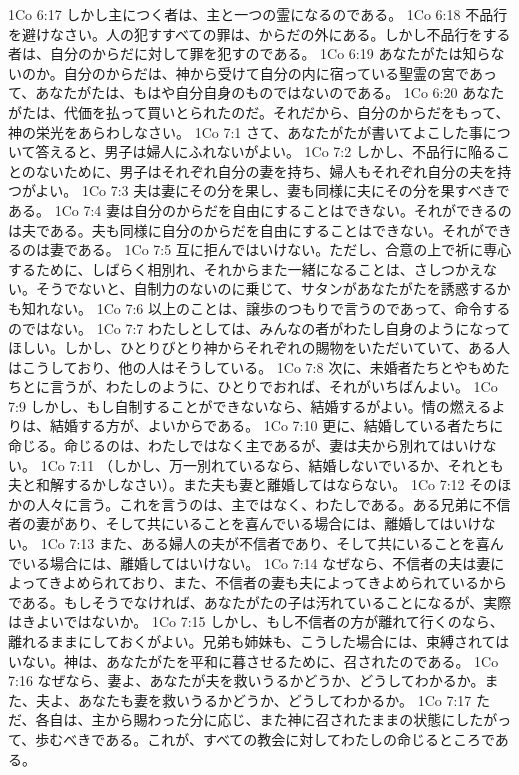 1Co 6:17  しかし主につく者は、主と一つの霊になるのである。
1Co 6:18  不品行を避けなさい。人の犯すすべての罪は、からだの外にある。しかし不品行をする者は、自分のからだに対して罪を犯すのである。
1Co 6:19  あなたがたは知らないのか。自分のからだは、神から受けて自分の内に宿っている聖霊の宮であって、あなたがたは、もはや自分自身のものではないのである。
1Co 6:20  あなたがたは、代価を払って買いとられたのだ。それだから、自分のからだをもって、神の栄光をあらわしなさい。
1Co 7:1  さて、あなたがたが書いてよこした事について答えると、男子は婦人にふれないがよい。
1Co 7:2  しかし、不品行に陥ることのないために、男子はそれぞれ自分の妻を持ち、婦人もそれぞれ自分の夫を持つがよい。
1Co 7:3  夫は妻にその分を果し、妻も同様に夫にその分を果すべきである。
1Co 7:4  妻は自分のからだを自由にすることはできない。それができるのは夫である。夫も同様に自分のからだを自由にすることはできない。それができるのは妻である。
1Co 7:5  互に拒んではいけない。ただし、合意の上で祈に専心するために、しばらく相別れ、それからまた一緒になることは、さしつかえない。そうでないと、自制力のないのに乗じて、サタンがあなたがたを誘惑するかも知れない。
1Co 7:6  以上のことは、譲歩のつもりで言うのであって、命令するのではない。
1Co 7:7  わたしとしては、みんなの者がわたし自身のようになってほしい。しかし、ひとりびとり神からそれぞれの賜物をいただいていて、ある人はこうしており、他の人はそうしている。
1Co 7:8  次に、未婚者たちとやもめたちとに言うが、わたしのように、ひとりでおれば、それがいちばんよい。
1Co 7:9  しかし、もし自制することができないなら、結婚するがよい。情の燃えるよりは、結婚する方が、よいからである。
1Co 7:10  更に、結婚している者たちに命じる。命じるのは、わたしではなく主であるが、妻は夫から別れてはいけない。
1Co 7:11  （しかし、万一別れているなら、結婚しないでいるか、それとも夫と和解するかしなさい）。また夫も妻と離婚してはならない。
1Co 7:12  そのほかの人々に言う。これを言うのは、主ではなく、わたしである。ある兄弟に不信者の妻があり、そして共にいることを喜んでいる場合には、離婚してはいけない。
1Co 7:13  また、ある婦人の夫が不信者であり、そして共にいることを喜んでいる場合には、離婚してはいけない。
1Co 7:14  なぜなら、不信者の夫は妻によってきよめられており、また、不信者の妻も夫によってきよめられているからである。もしそうでなければ、あなたがたの子は汚れていることになるが、実際はきよいではないか。
1Co 7:15  しかし、もし不信者の方が離れて行くのなら、離れるままにしておくがよい。兄弟も姉妹も、こうした場合には、束縛されてはいない。神は、あなたがたを平和に暮させるために、召されたのである。
1Co 7:16  なぜなら、妻よ、あなたが夫を救いうるかどうか、どうしてわかるか。また、夫よ、あなたも妻を救いうるかどうか、どうしてわかるか。
1Co 7:17  ただ、各自は、主から賜わった分に応じ、また神に召されたままの状態にしたがって、歩むべきである。これが、すべての教会に対してわたしの命じるところである。
